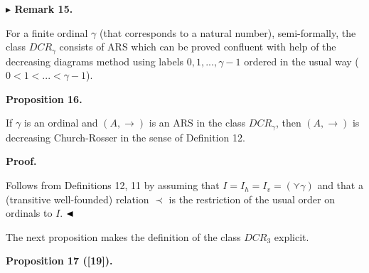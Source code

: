  
 
\par\medskip\noindent\textbf{$\blacktriangleright$ Remark 15.}\par
 
 
For a finite ordinal $\gamma$ (that corresponds to a natural number), semi-formally, the class $DCR_{\gamma}$ consists of ARS which can be proved confluent with help of the decreasing diagrams method using labels $0,1,...,\gamma-1$ ordered in the usual way ($0<1<...<\gamma-1$).\par
 
 
 
 
\par\medskip\noindent\textbf{Proposition 16.}\par
 
 
If $\gamma$ is an ordinal and $(A,\to)$ is an ARS in the class $DCR_{\gamma}$, then $(A,\to)$ is decreasing Church-Rosser in the sense of Definition 12.\par
 
 
 
 
\par\medskip\noindent\textbf{Proof.}\par
 
 
Follows from Definitions 12, 11 by assuming that $I=I_{h}=I_{v}=(\curlyvee\gamma)$ and that a (transitive well-founded) relation $\prec$ is the restriction of the usual order on ordinals to $I$. $\hfill\blacktriangleleft$\par
 
 
 
The next proposition makes the definition of the class $DCR_{3}$ explicit.\par
 
 
 
\par\medskip\noindent\textbf{Proposition 17 ([19]).}\par
 

